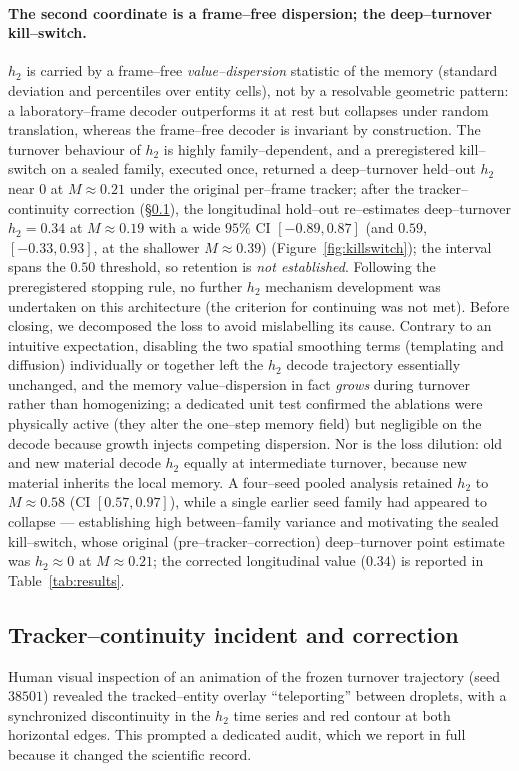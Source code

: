 \documentclass[11pt]{article}
\begin{document}
\paragraph{The second coordinate is a frame--free dispersion; the deep--turnover kill--switch.} $h_2$ is carried by
a frame--free \emph{value--dispersion} statistic of the memory (standard deviation and percentiles over entity
cells), not by a resolvable geometric pattern: a laboratory--frame decoder outperforms it at rest but collapses
under random translation, whereas the frame--free decoder is invariant by construction. The turnover behaviour of
$h_2$ is highly family--dependent, and a preregistered kill--switch on a sealed family, executed once, returned a deep--turnover held--out $h_2$ near $0$ at $M\approx0.21$ under the original per--frame tracker; after the tracker--continuity correction (\S\ref{sec:tracker}), the longitudinal hold--out re--estimates deep--turnover $h_2=0.34$ at $M\approx0.19$ with a wide $95\%$ CI $[-0.89,0.87]$ (and $0.59$, $[-0.33,0.93]$, at the shallower $M\approx0.39$) (Figure~\ref{fig:killswitch}); the interval spans the $0.50$ threshold, so retention is \emph{not established}. Following the preregistered stopping rule, no further $h_2$ mechanism development was undertaken on this architecture (the criterion for continuing was not met). Before closing, we decomposed the loss to avoid mislabelling its cause. Contrary to an intuitive expectation, disabling the two spatial smoothing terms (templating and diffusion) individually or together left the $h_2$ decode trajectory essentially unchanged, and the memory value--dispersion in fact \emph{grows} during turnover rather than homogenizing; a dedicated unit test confirmed the ablations were physically active (they alter the one--step memory field) but negligible on the decode because growth injects competing dispersion. Nor is the loss dilution: old and new material decode $h_2$ equally at intermediate turnover, because new material inherits the local memory. A four--seed pooled analysis retained $h_2$ to $M\approx0.58$ (CI $[0.57,0.97]$), while a single earlier seed family had appeared to collapse --- establishing high between--family variance and motivating the sealed kill--switch, whose original (pre--tracker--correction) deep--turnover point estimate was $h_2\approx0$ at $M\approx0.21$; the corrected longitudinal value ($0.34$) is reported in Table~\ref{tab:results}.

\subsection{Tracker--continuity incident and correction}
\label{sec:tracker}
Human visual inspection of an animation of the frozen turnover trajectory (seed $38501$) revealed the
tracked--entity overlay ``teleporting'' between droplets, with a synchronized discontinuity in the $h_2$
time series and red contour at both horizontal edges. This prompted a dedicated audit, which we report in full
because it changed the scientific record.
\end{document}
